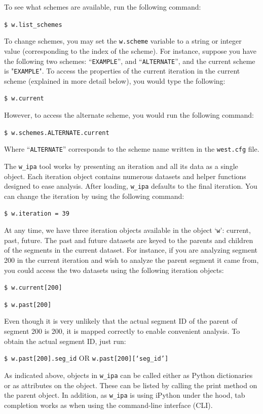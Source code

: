 \documentclass[9pt,tutorial,ASAPversion]{livecoms}
\begin{document}
To see what schemes are available, run the following command:

\verb|$ w.list_schemes|

To change schemes, you may set the \verb|w.scheme| variable to a string or integer value (corresponding to the index of the scheme). 
For instance, suppose you have the following two schemes: “\verb|EXAMPLE|”, and “\verb|ALTERNATE|”, and the current scheme is "\verb|EXAMPLE|". 
To access the properties of the current iteration in the current scheme (explained in more detail below), you would type the following:

\verb|$ w.current|

However, to access the alternate scheme, you would run the following command:

\verb|$ w.schemes.ALTERNATE.current|

Where “\verb|ALTERNATE|” corresponds to the scheme name written in the \verb|west.cfg| file.

The \verb|w_ipa| tool works by presenting an iteration and all its data as a single object. Each iteration object contains numerous datasets and helper functions designed to ease analysis. 
After loading, \verb|w_ipa| defaults to the final iteration. 
You can change the iteration by using the following command: 

\verb|$ w.iteration = 39|

At any time, we have three iteration objects available in the object ‘\verb|w|’: current, past, future. 
The past and future datasets are keyed to the parents and children of the segments in the current dataset. 
For instance, if you are analyzing segment 200 in the current iteration and wish to analyze the parent segment it came from, you could access the two datasets using the following iteration objects:

\verb|$ w.current[200]|

\verb|$ w.past[200]|

Even though it is very unlikely that the actual segment ID of the parent of segment 200 is 200, it is mapped correctly to enable convenient analysis. 
To obtain the actual segment ID, just run:

\verb|$ w.past[200].seg_id| OR \verb|w.past[200][‘seg_id’]|

As indicated above, objects in \verb|w_ipa| can be called either as Python dictionaries or as attributes on the object. 
These can be listed by calling the print method on the parent object. 
In addition, as \verb|w_ipa| is using iPython under the hood, tab completion works as when using the command-line interface (CLI).
\end{document}
